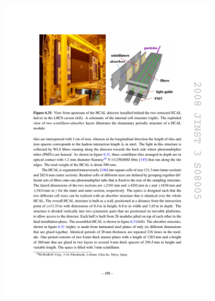 \begin{figure}[!h]
    \centering
    \begin{subfigure}[t]{0.4\textwidth}
        \centering        
        \includegraphics[width=1.0\textwidth]{figs/Detector/hcal_diagram.pdf}
    \end{subfigure}
    \begin{subfigure}[t]{0.4\textwidth}
        \centering

\end{subfigure}
\end{figure}
